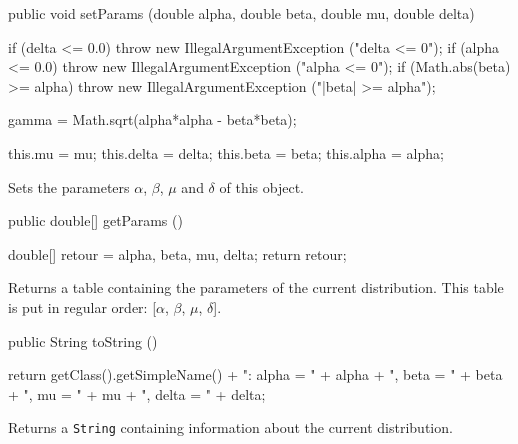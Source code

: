 \begin{code}

   public void setParams (double alpha, double beta, double mu,
                          double delta)\begin{hide} {
      if (delta <= 0.0)
         throw new IllegalArgumentException ("delta <= 0");
      if (alpha <= 0.0)
         throw new IllegalArgumentException ("alpha <= 0");
      if (Math.abs(beta) >= alpha)
         throw new IllegalArgumentException ("|beta| >= alpha");

      gamma = Math.sqrt(alpha*alpha - beta*beta);

      this.mu = mu;
      this.delta = delta;
      this.beta = beta;
      this.alpha = alpha;
   }\end{hide}
\end{code}
\begin{tabb}
   Sets the parameters $\alpha$, $\beta$, $\mu$ and $\delta$ of this object.
\end{tabb}
\begin{code}

   public double[] getParams ()\begin{hide} {
      double[] retour = {alpha, beta, mu, delta};
      return retour;
   }\end{hide}
\end{code}
\begin{tabb}
   Returns a table containing the parameters of the current distribution.
   This table is put in regular order: [$\alpha$, $\beta$, $\mu$, $\delta$].
\end{tabb}
\begin{hide}\begin{code}

   public String toString ()\begin{hide} {
      return getClass().getSimpleName() + ": alpha = " + alpha + ", beta = " + beta +
                  ", mu = " + mu + ", delta = " + delta;
   }\end{hide}
\end{code}
\begin{tabb}
   Returns a \texttt{String} containing information about the current distribution.
\end{tabb}\end{hide}
\begin{code}\begin{hide}
}\end{hide}
\end{code}
